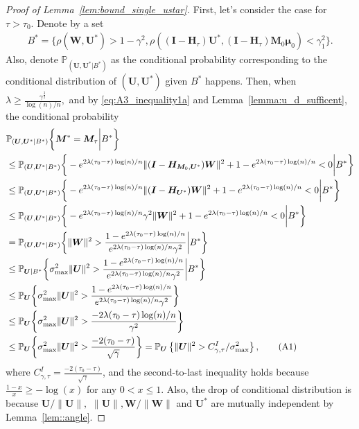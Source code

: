 \documentclass[12pt]{article}
\theoremstyle{shortspace}
\def\*#1{\bm{#1}}
\def\P{\mathbb P}
\newcommand\numberthis{\addtocounter{equation}{1}\tag{\theequation}}
\begin{document}
\begin{proof}[Proof of Lemma~\ref{lem:bound_single_ustar}]
First, let's consider the case for $\tau > \tau_0.$
Denote by a set 
\begin{align*}
 B^*  =  \bigg\{\rho(\*W, \*U^*) > 1-\gamma^2, \rho((\*I - \*H_\tau)\*U^*, (\*I - \*H_\tau)\*M_0\*\mu_0)<  \gamma_1^2\bigg\}. 
\end{align*}
Also, denote $\P_{(\*U, \*U^*|B^*)}$ as the conditional probability corresponding to the conditional distribution of $(\*U, \*U^*)$ given $B^*$ happens.
  Then, when $\lambda \geq \frac{\gamma^{\frac32}}{\log(n)/n},$ and by \eqref{eq:A3_inequality1a} and Lemma~\ref{lemma:u_d_sufficent}, the conditional probability
\begin{align*}
     & \P_{(\*U, \*U^*|B^*)}\bigg\{{\*M}^* = \*M_\tau \bigg | B^*\bigg\} \\
    & \leq \P_{(\*U, \*U^*|B^*)}\bigg\{ - e^{2\lambda(\tau_0-\tau)\log(n)/n} \|(\*I-\*H_{\*M_0, \*U^*})\*W\|^2+1 -e^{2\lambda(\tau_0-\tau)\log(n)/n} < 0 \bigg| B^*\bigg\}\\
    & \leq \P_{(\*U, \*U^*|B^*)}\bigg\{ - e^{2\lambda(\tau_0-\tau)\log(n)/n} \|(\*I-\*H_{\*U^*})\*W\|^2+1 -e^{2\lambda(\tau_0-\tau)\log(n)/n} < 0 \bigg |  B^*\bigg\} \\
    & \leq \P_{(\*U, \*U^*|B^*)}\bigg\{ - e^{2\lambda(\tau_0-\tau)\log(n)/n}\gamma^2\|\*W\|^2 +1 -e^{2\lambda(\tau_0-\tau)\log(n)/n} < 0 \bigg | B^*
    \bigg\}\\
    & = 
    \P_{(\*U, \*U^*|B^*)}\bigg\{ \|\*W\|^2 > \frac{1 -e^{2\lambda(\tau_0-\tau)\log(n)/n}}{ e^{2\lambda(\tau_0-\tau)\log(n)/n}\gamma^2} \bigg |B^*\bigg\}\\
    & \leq \P_{\*U|B^*}\bigg\{ \sigma^2_{\max}\|\*U\|^2 > \frac{1 -e^{2\lambda(\tau_0-\tau)\log(n)/n}}{ e^{2\lambda(\tau_0-\tau)\log(n)/n}\gamma^2} \bigg | B^*\bigg\}
  \\
    & \leq \P_{\*U}\bigg\{ \sigma^2_{\max}\|\*U\|^2 > \frac{1 -e^{2\lambda(\tau_0-\tau)\log(n)/n}}{ e^{2\lambda(\tau_0-\tau)\log(n)/n}\gamma^2} \bigg\}\\
    & \leq \P_{\*U}\bigg\{ \sigma^2_{\max}\|\*U\|^2 > \frac{ -2\lambda(\tau_0-\tau)\log(n)/n}{ \gamma^2} \bigg\}\\
    & \leq \P_{\*U}\bigg\{ \sigma^2_{\max}\|\*U\|^2 > \frac{ -2(\tau_0-\tau)}{ \sqrt{\gamma}} \bigg\} =  \P_{\*U}\left\{\|\*U\|^2  >  C^I_{\gamma, \tau}/\sigma^2_{\max}\right\}, \numberthis \label{eq:CI_gamma}
 \end{align*}
 where $C^I_{\gamma, \tau} = \frac{ -2(\tau_0-\tau)}{ \sqrt{\gamma}}$, and  
 the second-to-last inequality holds because $\frac{1-x}{x}\geq  -\log(x)$ for any $0 < x \leq 1.$ Also, the 
 drop of conditional distribution is because $\*U/\|\*U\|,$ $\|\*U\|, \*W/\|\*W\|$ and $\*U^*$ are mutually independent by Lemma~\ref{lem::angle}. 
 


\end{proof}
\end{document}
